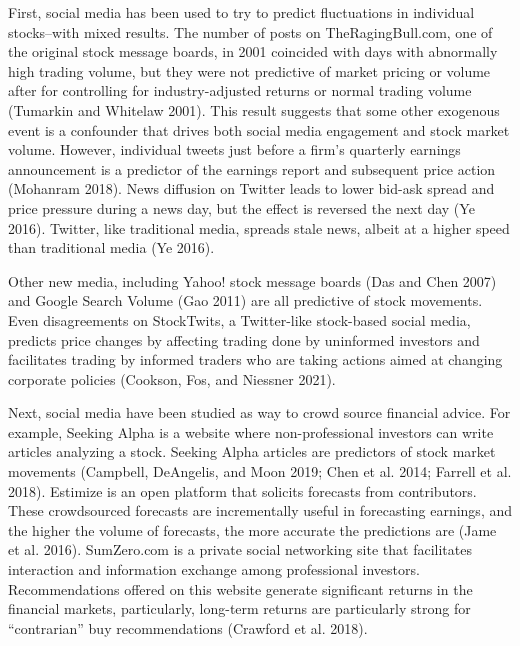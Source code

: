 \documentclass[12pt,]{article}
\begin{document}
First, social media has been used to try to predict fluctuations in
individual stocks--with mixed results. The number of posts on
TheRagingBull.com, one of the original stock message boards, in 2001
coincided with days with abnormally high trading volume, but they were
not predictive of market pricing or volume after for controlling for
industry-adjusted returns or normal trading volume (Tumarkin and
Whitelaw 2001). This result suggests that some other exogenous event is
a confounder that drives both social media engagement and stock market
volume. However, individual tweets just before a firm's quarterly
earnings announcement is a predictor of the earnings report and
subsequent price action (Mohanram 2018). News diffusion on Twitter leads
to lower bid-ask spread and price pressure during a news day, but the
effect is reversed the next day (Ye 2016). Twitter, like traditional
media, spreads stale news, albeit at a higher speed than traditional
media (Ye 2016).

Other new media, including Yahoo! stock message boards (Das and Chen
2007) and Google Search Volume (Gao 2011) are all predictive of stock
movements. Even disagreements on StockTwits, a Twitter-like stock-based
social media, predicts price changes by affecting trading done by
uninformed investors and facilitates trading by informed traders who are
taking actions aimed at changing corporate policies (Cookson, Fos, and
Niessner 2021).

Next, social media have been studied as way to crowd source financial
advice. For example, Seeking Alpha is a website where non-professional
investors can write articles analyzing a stock. Seeking Alpha articles
are predictors of stock market movements (Campbell, DeAngelis, and Moon
2019; Chen et al. 2014; Farrell et al. 2018). Estimize is an open
platform that solicits forecasts from contributors. These crowdsourced
forecasts are incrementally useful in forecasting earnings, and the
higher the volume of forecasts, the more accurate the predictions are
(Jame et al. 2016). SumZero.com is a private social networking site that
facilitates interaction and information exchange among professional
investors. Recommendations offered on this website generate significant
returns in the financial markets, particularly, long-term returns are
particularly strong for ``contrarian'' buy recommendations (Crawford et
al. 2018).
\end{document}
